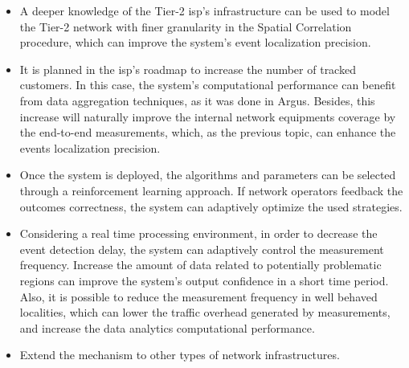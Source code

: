 \begin{itemize}
\item
A deeper knowledge of the Tier-2 \gls*{isp}'s infrastructure
can be used to model the Tier-2 network with finer granularity in the Spatial
Correlation procedure, which can improve the system's event localization
precision.

\item
It is planned in the \gls*{isp}'s roadmap to increase the number of tracked customers.
In this case, the system's computational performance can benefit from data
aggregation techniques, as it was done in Argus.
Besides, this increase will naturally improve the internal network equipments
coverage by the end-to-end measurements, which, as the previous topic, can
enhance the events localization precision.

\item
Once the system is deployed, the algorithms and parameters can be selected
through a reinforcement learning approach. If network operators
feedback the outcomes correctness, the system can adaptively optimize the used
strategies.

\item
Considering a real time processing environment, in order to decrease the
event detection delay, the system can adaptively control the measurement
frequency.
Increase the amount of data related to potentially problematic regions
can improve the system's output confidence in a short time period.
Also, it is possible to reduce the measurement frequency in well behaved
localities, which can lower the traffic overhead generated by measurements, and
increase the data analytics computational performance.

\item
Extend the mechanism to other types of network infrastructures.

\end{itemize}
